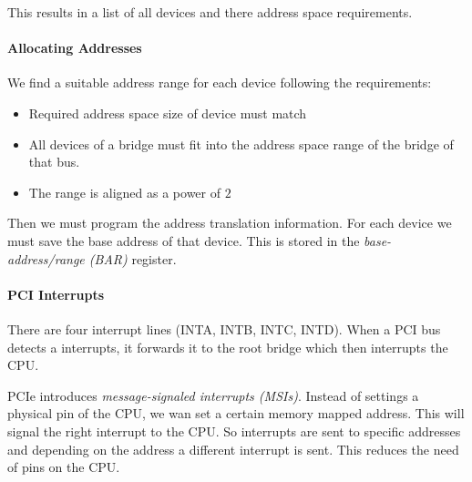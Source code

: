 This results in a list of all devices and there address space requirements.

\paragraph{Allocating Addresses}
We find a suitable address range for each device following the requirements:
\begin{itemize}
    \item Required address space size of device must match
    \item All devices of a bridge must fit into the address space range of the bridge of that bus.
    \item The range is aligned as a power of $2$
\end{itemize}

Then we must program the address translation information. For each device we must save the base address of that device. This is stored in the \textit{base-address/range (BAR)} register.

\paragraph{PCI Interrupts}
There are four interrupt lines (INTA, INTB, INTC, INTD). When a PCI bus detects a interrupts, it forwards it to the root bridge which then interrupts the CPU. 

PCIe introduces \textit{message-signaled interrupts (MSIs)}. Instead of settings a physical pin of the CPU, we wan set a certain memory mapped address. This will signal the right interrupt to the CPU. So interrupts are sent to specific addresses and depending on the address a different interrupt is sent. This reduces the need of pins on the CPU.
